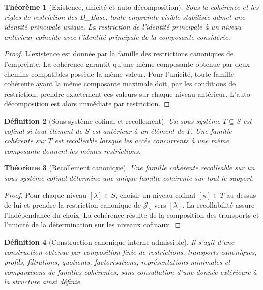 \documentclass[11pt,a4paper,openany]{book}
\newtheorem{definition}{Définition}[chapter]
\newtheorem{theorem}[definition]{Théorème}
\begin{document}
\begin{theorem}[Existence, unicité et auto-décomposition]
Sous la cohérence et les règles de restriction des D\_Base, toute empreinte visible stabilisée admet une identité principale unique. La restriction de l'identité principale à un niveau antérieur coïncide avec l'identité principale de la composante considérée.
\end{theorem}

\begin{proof}
L'existence est donnée par la famille des restrictions canoniques de l'empreinte. La cohérence garantit qu'une même composante obtenue par deux chemins compatibles possède la même valeur. Pour l'unicité, toute famille cohérente ayant la même composante maximale doit, par les conditions de restriction, prendre exactement ces valeurs sur chaque niveau antérieur. L'auto-décomposition est alors immédiate par restriction.
\end{proof}

\begin{definition}[Sous-système cofinal et recollement]
Un sous-système \(T\subseteq S\) est cofinal si tout élément de \(S\) est antérieur à un élément de \(T\). Une famille cohérente sur \(T\) est recolleable lorsque les accès concurrents à une même composante donnent les mêmes restrictions.
\end{definition}

\begin{theorem}[Recollement canonique]
Une famille cohérente recolleable sur un sous-système cofinal détermine une unique famille cohérente sur tout le support.
\end{theorem}

\begin{proof}
Pour chaque niveau \([\lambda]\in S\), choisir un niveau cofinal \([\kappa]\in T\) au-dessus de lui et prendre la restriction canonique de \(\mathcal J_\kappa\) vers \([\lambda]\). La recollabilité assure l'indépendance du choix. La cohérence résulte de la composition des transports et l'unicité de la détermination sur les niveaux cofinaux.
\end{proof}

\begin{definition}[Construction canonique interne admissible]
Il s'agit d'une construction obtenue par composition finie de restrictions, transports canoniques, profils, filtrations, quotients, factorisations, représentations minimales et comparaisons de familles cohérentes, sans consultation d'une donnée extérieure à la structure ainsi définie.
\end{definition}
\end{document}
